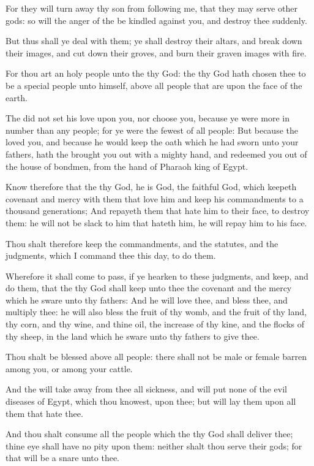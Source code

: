 \verse For they will turn away thy son from following me, that they may serve other gods: so will the anger of the \LORD be kindled against you, and destroy thee suddenly.

\verse But thus shall ye deal with them; ye shall destroy their altars, and break down their images, and cut down their groves, and burn their graven images with fire.

\verse For thou art an holy people unto the \LORD thy God: the \LORD thy God hath chosen thee to be a special people unto himself, above all people that are upon the face of the earth.

\verse The \LORD did not set his love upon you, nor choose you, because ye were more in number than any people; for ye were the fewest of all people: \verse But because the \LORD loved you, and because he would keep the oath which he had sworn unto your fathers, hath the \LORD brought you out with a mighty hand, and redeemed you out of the house of bondmen, from the hand of Pharaoh king of Egypt.

\verse Know therefore that the \LORD thy God, he is God, the faithful God, which keepeth covenant and mercy with them that love him and keep his commandments to a thousand generations; \verse And repayeth them that hate him to their face, to destroy them: he will not be slack to him that hateth him, he will repay him to his face.

\verse Thou shalt therefore keep the commandments, and the statutes, and the judgments, which I command thee this day, to do them.

\verse Wherefore it shall come to pass, if ye hearken to these judgments, and keep, and do them, that the \LORD thy God shall keep unto thee the covenant and the mercy which he sware unto thy fathers: \verse And he will love thee, and bless thee, and multiply thee: he will also bless the fruit of thy womb, and the fruit of thy land, thy corn, and thy wine, and thine oil, the increase of thy kine, and the flocks of thy sheep, in the land which he sware unto thy fathers to give thee.

\verse Thou shalt be blessed above all people: there shall not be male or female barren among you, or among your cattle.

\verse And the \LORD will take away from thee all sickness, and will put none of the evil diseases of Egypt, which thou knowest, upon thee; but will lay them upon all them that hate thee.

\verse And thou shalt consume all the people which the \LORD thy God shall deliver thee; thine eye shall have no pity upon them: neither shalt thou serve their gods; for that will be a snare unto thee.

